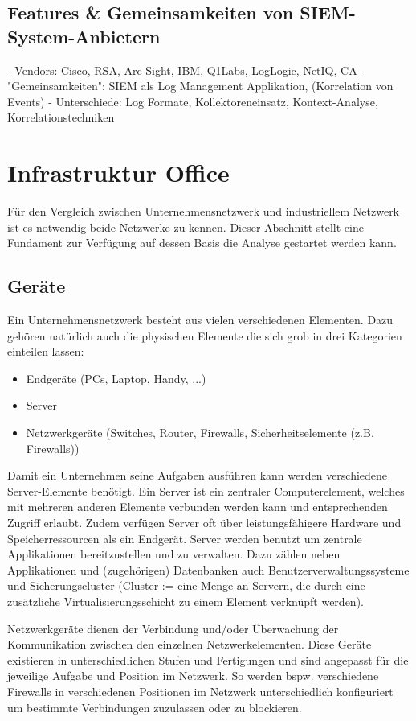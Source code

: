 \subsection{Features \&  Gemeinsamkeiten von SIEM-System-Anbietern}
- Vendors: Cisco, RSA, Arc Sight, IBM, Q1Labs, LogLogic, NetIQ, CA
- "Gemeinsamkeiten": SIEM als Log Management Applikation, (Korrelation von Events) 
- Unterschiede: Log Formate, Kollektoreneinsatz, Kontext-Analyse, Korrelationstechniken


\section{Infrastruktur Office}

Für den Vergleich zwischen Unternehmensnetzwerk und industriellem Netzwerk ist es notwendig beide Netzwerke zu kennen. Dieser Abschnitt stellt eine Fundament zur Verfügung auf dessen Basis die Analyse gestartet werden kann.

\subsection{Geräte}
Ein Unternehmensnetzwerk besteht aus vielen verschiedenen Elementen. Dazu gehören natürlich auch die physischen Elemente die sich grob in drei Kategorien einteilen lassen:
\begin{itemize}
\item Endgeräte (PCs, Laptop, Handy, ...)
\item Server
\item Netzwerkgeräte (Switches, Router, Firewalls, Sicherheitselemente (z.B. Firewalls))
\end{itemize}

Damit ein Unternehmen seine Aufgaben ausführen kann werden verschiedene Server-Elemente benötigt. Ein Server ist ein zentraler Computerelement, welches mit mehreren anderen Elemente verbunden werden kann und entsprechenden Zugriff erlaubt. Zudem verfügen Server oft über leistungsfähigere Hardware und Speicherressourcen als ein Endgerät. Server werden benutzt um zentrale Applikationen bereitzustellen und zu verwalten. Dazu zählen neben Applikationen und (zugehörigen) Datenbanken auch Benutzerverwaltungssysteme und Sicherungscluster (Cluster := eine Menge an Servern, die durch eine zusätzliche Virtualisierungsschicht zu einem Element verknüpft werden).

Netzwerkgeräte dienen der Verbindung und/oder Überwachung der Kommunikation zwischen den einzelnen Netzwerkelementen. Diese Geräte existieren in unterschiedlichen Stufen und Fertigungen und sind angepasst für die jeweilige Aufgabe und Position im Netzwerk. So werden bspw. verschiedene Firewalls in verschiedenen Positionen im Netzwerk unterschiedlich konfiguriert um bestimmte Verbindungen zuzulassen oder zu blockieren.


